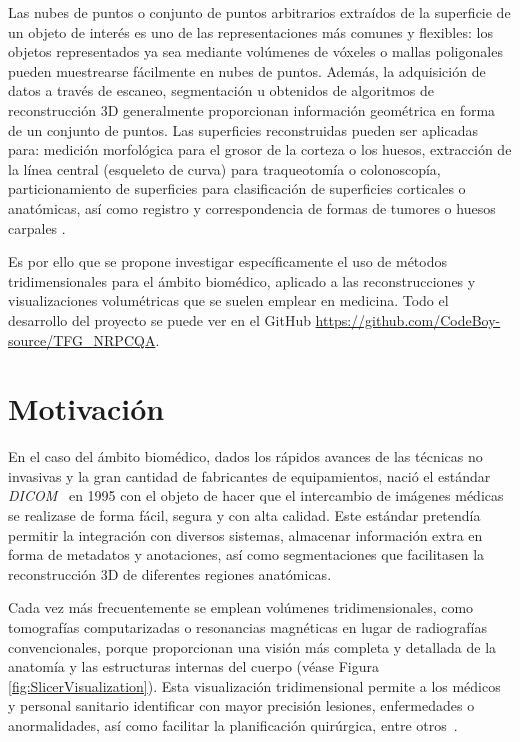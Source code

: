 Las nubes de puntos o conjunto de puntos arbitrarios extraídos de la superficie 
de un objeto de interés es uno de las representaciones más comunes y flexibles:
los objetos representados ya sea mediante volúmenes de vóxeles o mallas poligonales
pueden muestrearse fácilmente en nubes de puntos. Además, la adquisición de 
datos a través de escaneo, segmentación u obtenidos de algoritmos de reconstrucción 
3D generalmente proporcionan información geométrica en forma de un conjunto de puntos. 
Las superficies reconstruidas pueden ser aplicadas para:
medición morfológica para el grosor de la corteza o los huesos,
extracción de la línea central (esqueleto de curva) para traqueotomía o colonoscopía,
particionamiento de superficies para clasificación de superficies corticales o
anatómicas, así como registro y correspondencia de formas de tumores o huesos carpales 
\cite{WhyUsePointCloud}.

Es por ello que se propone investigar específicamente el uso de métodos tridimensionales
para el ámbito biomédico, aplicado a las reconstrucciones y visualizaciones volumétricas 
que se suelen emplear en medicina. Todo el desarrollo del proyecto se puede 
ver en el GitHub \url{https://github.com/CodeBoy-source/TFG_NRPCQA}.

\section{Motivación}
 
En el caso del ámbito biomédico, dados los rápidos avances 
de las técnicas no invasivas y la gran cantidad de fabricantes 
de equipamientos, nació el estándar \emph{DICOM}~\cite{Parisot1995} en 1995 
con el objeto de hacer que el intercambio de imágenes médicas se realizase de forma 
fácil, segura y con alta calidad. Este estándar pretendía permitir la integración con diversos sistemas, 
almacenar información extra en forma de metadatos y anotaciones, así como segmentaciones que facilitasen la reconstrucción 3D de diferentes regiones anatómicas.

Cada vez más frecuentemente se emplean volúmenes tridimensionales, como tomografías computarizadas o
resonancias magnéticas en lugar de radiografías convencionales, porque 
proporcionan una visión más completa y detallada de la anatomía y las estructuras 
internas del cuerpo (véase Figura \ref{fig:SlicerVisualization}). 
Esta visualización tridimensional permite a los médicos y personal sanitario 
identificar con mayor precisión lesiones, enfermedades o anormalidades,
así como facilitar la planificación quirúrgica, entre otros~\cite{3DImagingInMedicine, 3DImagingInMedicine2, ADAS3D}.
 
